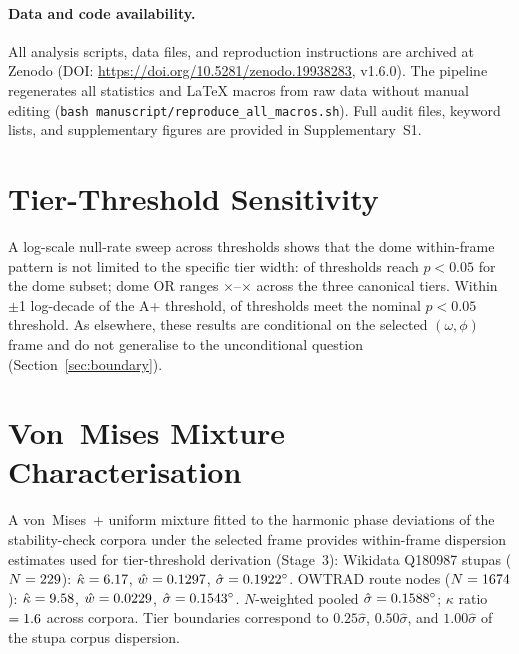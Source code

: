 \documentclass[12pt,a4paper]{article}
\begin{document}

\paragraph{Data and code availability.}
\label{sec:data_code}
All analysis scripts, data files, and reproduction instructions are
archived at Zenodo (DOI: \url{https://doi.org/10.5281/zenodo.19938283},
v1.6.0). The pipeline regenerates all statistics and LaTeX macros from
raw data without manual editing
(\texttt{bash manuscript/reproduce\_all\_macros.sh}). Full audit files,
keyword lists, and supplementary figures are provided in
Supplementary~S1.


\appendix

\section{Tier-Threshold Sensitivity}
\label{app:tier_sensitivity}

A log-scale null-rate sweep across \logSweepNtaus{} thresholds shows
that the dome within-frame pattern is not limited to the specific
tier width: \logSweepNsig{} of \logSweepNtaus{} thresholds reach
$p < 0.05$ for the dome subset; dome OR ranges
\logSweepMinEnrichCanon{}$\times$--\logSweepMaxEnrichCanon{}$\times$
across the three canonical tiers. Within $\pm$1 log-decade of the A+
threshold, \logSweepAregionNsig{} of \logSweepAregionNtaus{}
thresholds meet the nominal $p < 0.05$ threshold. As elsewhere, these
results are conditional on the selected $(\omega, \phi)$ frame and do
not generalise to the unconditional question
(Section~\ref{sec:boundary}).

\section{Von~Mises Mixture Characterisation}
\label{app:vonmises}

A von~Mises~+ uniform mixture fitted to the harmonic phase deviations
of the stability-check corpora under the selected frame provides
within-frame dispersion estimates used for tier-threshold derivation
(Stage~3): Wikidata Q180987 stupas ($N = 229{}$):
$\hat{\kappa} = 6.17{}$, $\hat{w} = 0.1297{}$,
$\hat{\sigma} = 0.1922{}^\circ$. OWTRAD route nodes
($N = 1674{}$): $\hat{\kappa} = 9.58{}$,
$\hat{w} = 0.0229{}$,
$\hat{\sigma} = 0.1543{}^\circ$. $N$-weighted pooled
$\hat{\sigma} = 0.1588{}^\circ$; $\kappa$ ratio
$= 1.6{}$ across corpora. Tier boundaries correspond to
$0.25\hat{\sigma}$, $0.50\hat{\sigma}$, and $1.00\hat{\sigma}$ of the
stupa corpus dispersion.
\end{document}

